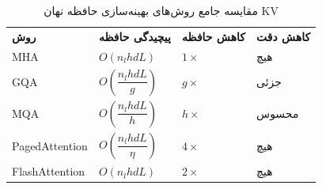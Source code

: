 \begin{table}[ht]
\centering
\caption{مقایسه جامع روش‌های بهینه‌سازی حافظه نهان KV}
\label{tab:comparison}
\renewcommand{\arraystretch}{1.5}
\setlength{\tabcolsep}{10pt}
\begin{tabular}{
  >{\centering\arraybackslash}p{2.7cm}
  !{\color{thickblue}\vrule width 1.5pt}
  >{\centering\arraybackslash}p{2.7cm}
  >{\centering\arraybackslash}p{2.7cm}
  >{\centering\arraybackslash}p{2.7cm}
}
\hline
{}
\textbf{روش} & \textbf{پیچیدگی حافظه} & \textbf{کاهش حافظه} & \textbf{کاهش دقت} \\
\Xhline{2pt}
MHA & $O(n_l h d L)$ & $1\times$ & هیچ \\
\hline
{}
GQA & $O\left(\dfrac{n_l h d L}{g}\right)$ & $g\times$ & جزئی  \\
\hline
{}
MQA & $O\left(\dfrac{n_l h d L}{h}\right)$ & $h\times$ & محسوس  \\
\hline
{}
PagedAttention & $O\left(\dfrac{n_l h d L}{\eta}\right)$ & $4\times$ & هیچ \\
\hline
{}
FlashAttention & $O(n_l h d L)$ & $2\times$ & هیچ \\
\hline
\end{tabular}
\end{table}